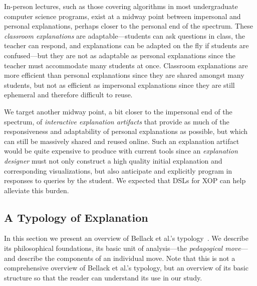 \documentclass[conference]{IEEEtran}
\begin{document}
In-person lectures, such as those covering algorithms in most undergraduate
computer science programs, exist at a midway point between impersonal and
personal explanations, perhaps closer to the personal end of the spectrum.
These \emph{classroom explanations} are adaptable---students can ask questions
in class, the teacher can respond, and explanations can be adapted on the fly
if students are confused---but they are not as adaptable as personal
explanations since the teacher must accommodate many students at once.
Classroom explanations are more efficient than personal explanations since they
are shared amongst many students, but not as efficient as impersonal
explanations since they are still ephemeral and therefore difficult to reuse.


We target another midway point, a bit closer to the impersonal end of the
spectrum, of \emph{interactive explanation artifacts} that provide as much of
the responsiveness and adaptability of personal explanations as possible, but
which can still be massively shared and reused online. Such an explanation
artifact would be quite expensive to produce with current tools since an
\emph{explanation designer} must not only construct a high quality initial
explanation and corresponding visualizations, but also anticipate and
explicitly program in responses to queries by the student.
%
We expected that DSLs for XOP can help alleviate this burden.








\subsection{A Typology of Explanation}
\label{sec:back:typ}

In this section we present an overview of Bellack et al.'s
typology~\cite{bellack1966language}. We describe its philosophical foundations,
its basic unit of analysis---the \emph{pedagogical move}---and describe the
components of an individual move. Note that this is not a comprehensive
overview of Bellack et al.'s typology, but an overview of its basic structure
so that the reader can understand its use in our study.
\end{document}
